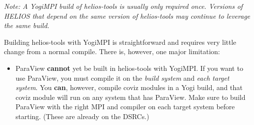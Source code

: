 \documentclass{article}
\begin{document}
\textit{Note: A YogiMPI build of helios-tools is usually only required once. Versions of HELIOS that depend on the same version of helios-tools may continue to leverage the same build.} 

Building helios-tools with YogiMPI is straightforward and requires very little change from a normal compile. There is, however, one major limitation:

\begin{itemize}
\item ParaView \textbf{cannot} yet be built in helios-tools with YogiMPI.  If you want to use ParaView, you must compile it on the \textit{build system} and \textit{each target system}. You \textbf{can}, however, compile coviz modules in a Yogi build, and that coviz module will run on any system that has ParaView. Make sure to build ParaView with the right MPI and compiler on each target system before starting. (These are already on the DSRCs.)
\end{itemize}
\end{document}
